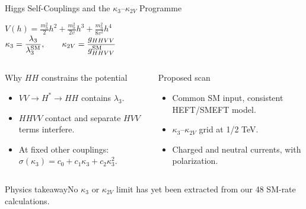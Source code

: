 \documentclass[aspectratio=1610,english]{beamer}
\newcommand{\src}[1]{\vfill{\par\color{black!65}\fontsize{6.4}{7.4}\selectfont\emph{Source:} #1\par}}
\newcommand{\key}[1]{\begin{alertblock}{Physics takeaway}\small  #1\end{alertblock}}
\begin{document}
\begin{frame}[t]{Higgs Self-Couplings and the $\kappa_3$--$\kappa_{2V}$ Programme}
\small

\begin{center}
$\displaystyle V(h)=\frac{m_h^2}{2}h^2+\frac{m_h^2}{2v}h^3+\frac{m_h^2}{8v^2}h^4$\\[.6em]
$\displaystyle \kappa_3=\frac{\lambda_3}{\lambda_3^{\rm SM}},\qquad \kappa_{2V}=\frac{g_{HHVV}}{g_{HHVV}^{\rm SM}}$
\end{center}
\begin{columns}%
\begin{block}{Why $HH$ constrains the potential}
\begin{itemize}
\justifying 
\item $VV\to H^*\to HH$ contains $\lambda_3$.
\item $HHVV$ contact and separate $HVV$ terms interfere.
\item At fixed other couplings: $\sigma(\kappa_3)=c_0+c_1\kappa_3+c_2\kappa_3^2$.
\end{itemize}\end{block}
\begin{exampleblock}{Proposed scan}
\begin{itemize}
\justifying 
\item Common SM input, consistent HEFT/SMEFT model.
\item $\kappa_3$--$\kappa_{2V}$ grid at 1/2 TeV.
\item Charged and neutral currents, with polarization.
\end{itemize}\end{exampleblock}
\end{columns}

\key{No $\kappa_3$ or $\kappa_{2V}$ limit has yet been extracted from our 48 SM-rate calculations.}

\end{frame}
\end{document}
